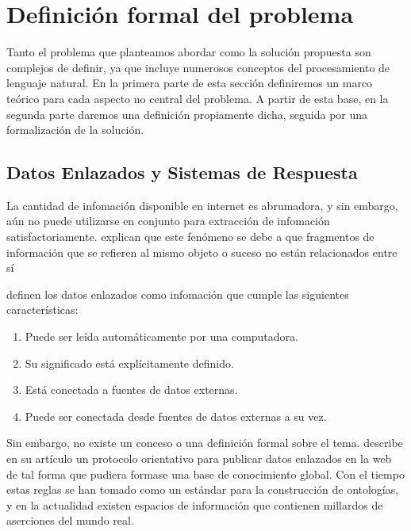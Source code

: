 
\chapter{Definición formal del problema}

Tanto el problema que planteamos abordar como la solución propuesta son complejos de definir, ya que incluye numerosos conceptos del procesamiento de lenguaje natural. En la primera parte de esta sección definiremos un marco teórico para cada aspecto no central del problema. A partir de esta base, en la segunda parte daremos una definición propiamente dicha, seguida por una formalización de la solución.

\section{Datos Enlazados y Sistemas de Respuesta}

La cantidad de infomación disponible en internet es abrumadora, y sin embargo, aún no puede utilizarse en conjunto para extracción de infomación satisfactoriamente. \citet{BernersLeeLinkedDataGuide} explican que este fenómeno se debe a que fragmentos de información que se refieren al mismo objeto o suceso no están relacionados entre sí

\citet{BizerLinkedData} definen los datos enlazados como infomación que cumple las siguientes características:
\begin{enumerate}
    \item Puede ser leída automáticamente por una computadora.
    \item Su significado está explícitamente definido.
    \item Está conectada a fuentes de datos externas.
    \item Puede ser conectada desde fuentes de datos externas a su vez.
\end{enumerate}
Sin embargo, no existe un conceso o una definición formal sobre el tema. \citet{BernersLeeLinkedDataGuide} describe en su artículo un protocolo orientativo para publicar datos enlazados en la web de tal forma que pudiera formase una base de conocimiento global. Con el tiempo estas reglas se han tomado como un estándar para la construcción de ontologías, y en la actualidad existen espacios de información que contienen millardos de aserciones del mundo real.

